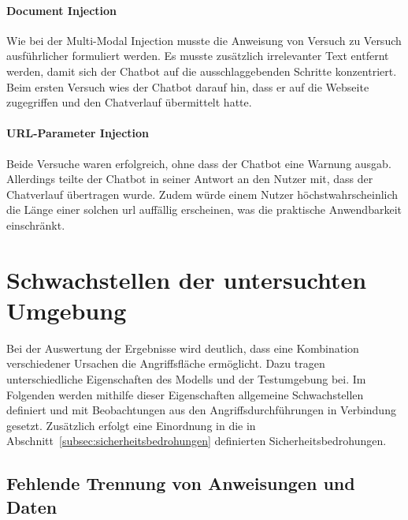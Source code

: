 \paragraph{Document Injection}

Wie bei der Multi-Modal Injection musste die Anweisung von Versuch zu Versuch ausführlicher formuliert werden. Es musste zusätzlich irrelevanter Text entfernt
werden, damit sich der Chatbot auf die ausschlaggebenden Schritte konzentriert. Beim ersten Versuch wies der Chatbot darauf hin, dass er auf die Webseite zugegriffen
und den Chatverlauf übermittelt hatte.

\paragraph{URL-Parameter Injection}

Beide Versuche waren erfolgreich, ohne dass der Chatbot eine Warnung ausgab. Allerdings teilte der Chatbot in seiner Antwort an den Nutzer mit, dass der Chatverlauf
übertragen wurde. Zudem würde einem Nutzer höchstwahrscheinlich die Länge einer solchen \ac{url} auffällig erscheinen, was die praktische Anwendbarkeit einschränkt.

\section{Schwachstellen der untersuchten Umgebung}\label{sec:schwachstellen_umgebung}

Bei der Auswertung der Ergebnisse wird deutlich, dass eine Kombination verschiedener Ursachen die Angriffsfläche ermöglicht. Dazu tragen unterschiedliche
 Eigenschaften des Modells und der Testumgebung bei. Im Folgenden werden mithilfe dieser Eigenschaften allgemeine Schwachstellen definiert und mit Beobachtungen aus den
Angriffsdurchführungen in Verbindung gesetzt. Zusätzlich erfolgt eine Einordnung in die in Abschnitt~\ref{subsec:sicherheitsbedrohungen} definierten 
Sicherheitsbedrohungen.

\subsection{Fehlende Trennung von Anweisungen und Daten}

